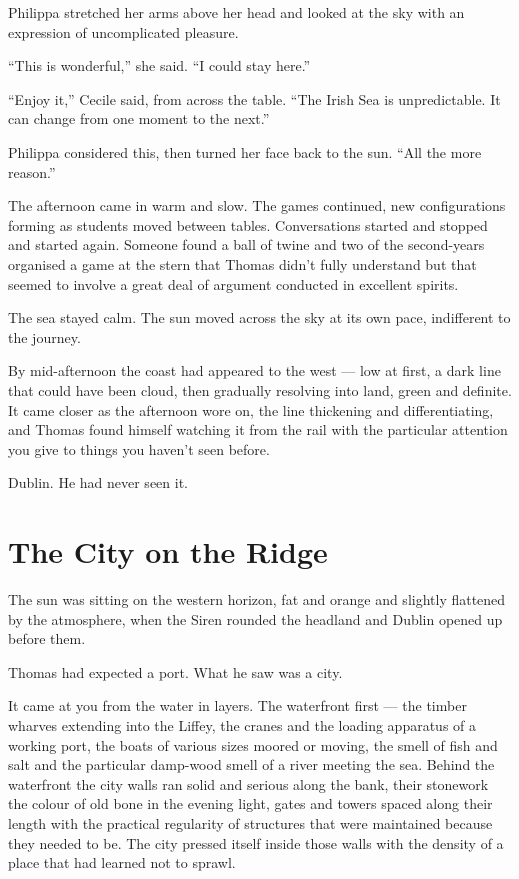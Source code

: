 Philippa stretched her arms above her head and looked at the sky with an expression of uncomplicated pleasure.

\enquote{This is wonderful,} she said. \enquote{I could stay here.}

\enquote{Enjoy it,} Cecile said, from across the table. \enquote{The Irish Sea is unpredictable. It can change from one moment to the next.}

Philippa considered this, then turned her face back to the sun. \enquote{All the more reason.}

The afternoon came in warm and slow. The games continued, new configurations forming as students moved between tables. Conversations started and stopped and started again. Someone found a ball of twine and two of the second-years organised a game at the stern that Thomas didn't fully understand but that seemed to involve a great deal of argument conducted in excellent spirits.

The sea stayed calm. The sun moved across the sky at its own pace, indifferent to the journey.

By mid-afternoon the coast had appeared to the west --- low at first, a dark line that could have been cloud, then gradually resolving into land, green and definite. It came closer as the afternoon wore on, the line thickening and differentiating, and Thomas found himself watching it from the rail with the particular attention you give to things you haven't seen before.

Dublin. He had never seen it.

\section*{The City on the Ridge}

The sun was sitting on the western horizon, fat and orange and slightly flattened by the atmosphere, when the Siren rounded the headland and Dublin opened up before them.

Thomas had expected a port. What he saw was a city.

It came at you from the water in layers. The waterfront first --- the timber wharves extending into the Liffey, the cranes and the loading apparatus of a working port, the boats of various sizes moored or moving, the smell of fish and salt and the particular damp-wood smell of a river meeting the sea. Behind the waterfront the city walls ran solid and serious along the bank, their stonework the colour of old bone in the evening light, gates and towers spaced along their length with the practical regularity of structures that were maintained because they needed to be. The city pressed itself inside those walls with the density of a place that had learned not to sprawl.

